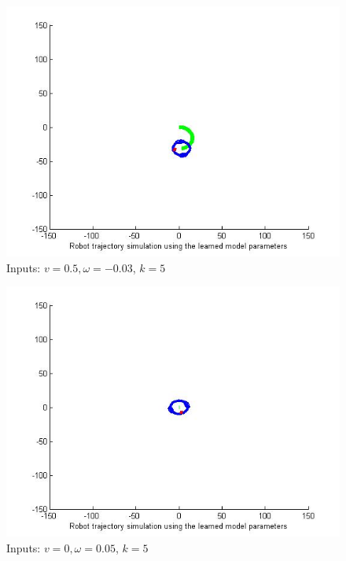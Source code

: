 \documentclass[10pt,a4paper]{report}
\begin{document}
\begin{figure}[!ht]
	\graphicspath{{./Exercise1/}}
	\centering
	\includegraphics[scale=0.5]{k_5_fig_1}	
	
	\begin{flushleft}
	\caption{Inputs: $v=0.5,\omega=-0.03$, $k=5$}
	\end{flushleft}
	\label{fig:fig_6}
\end{figure}

\begin{figure}[!ht]
	\graphicspath{{./Exercise1/}}
	\centering
	\includegraphics[scale=0.5]{k_5_fig_2}	
	
	\begin{flushleft}
	\caption{Inputs: $v=0,\omega=0.05$, $k=5$}
	\end{flushleft}
	\label{fig:fig_7}
	
\end{figure}
\end{document}
